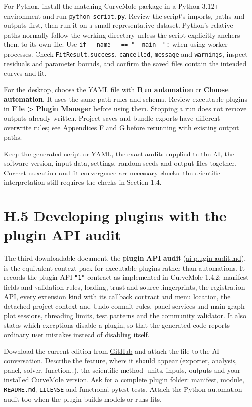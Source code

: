 \documentclass[
  10pt,
  a4paper,
  oneside]{scrreprt}
\begin{document}
For Python, install the matching CurveMole package in a Python 3.12+
environment and run \texttt{python\ script.py}. Review the script's
imports, paths and outputs first, then run it on a small representative
dataset. Python's relative paths normally follow the working directory
unless the script explicitly anchors them to its own file. Use
\texttt{if\ \_\_name\_\_\ ==\ "\_\_main\_\_":} when using worker
processes. Check \texttt{FitResult.success}, \texttt{cancelled},
\texttt{message} and \texttt{warnings}, inspect residuals and parameter
bounds, and confirm the saved files contain the intended curves and fit.

For the desktop, choose the YAML file with \textbf{Run automation} or
\textbf{Choose automation}. It uses the same path rules and schema.
Review executable plugins in \textbf{File \textgreater{} Plugin Manager}
before using them. Stopping a run does not remove outputs already
written. Project saves and bundle exports have different overwrite
rules; see Appendices F and G before rerunning with existing output
paths.

Keep the generated script or YAML, the exact audits supplied to the AI,
the software version, input data, settings, random seeds and output
files together. Correct execution and fit convergence are necessary
checks; the scientific interpretation still requires the checks in
Section 1.4.

\hypertarget{h.5-developing-plugins-with-the-plugin-api-audit}{%
\section{H.5 Developing plugins with the plugin API
audit}\label{h.5-developing-plugins-with-the-plugin-api-audit}}

The third downloadable document, the \textbf{plugin API audit}
(\url{ai-plugin-audit.md}), is the equivalent context pack for
executable plugins rather than automations. It records the plugin API
\texttt{"1"} contract as implemented in CurveMole 1.4.2: manifest fields
and validation rules, loading, trust and source fingerprints, the
registration API, every extension kind with its callback contract and
menu location, the detached project context and Undo commit rules, panel
services and main-graph plot sessions, threading limits, test patterns
and the community validator. It also states which exceptions disable a
plugin, so that the generated code reports ordinary user mistakes
instead of disabling itself.

Download the current edition from
\href{https://raw.githubusercontent.com/SebRoLENS/curvemole/main/docs/ai-plugin-audit.md}{GitHub}
and attach the file to the AI conversation. Describe the feature, where
it should appear (exporter, analysis, panel, solver, function\ldots),
the scientific method, units, inputs, outputs and your installed
CurveMole version. Ask for a complete plugin folder: manifest, module,
\texttt{README.md}, \texttt{LICENSE} and functional pytest tests. Attach
the Python automation audit too when the plugin builds models or runs
fits.
\end{document}
